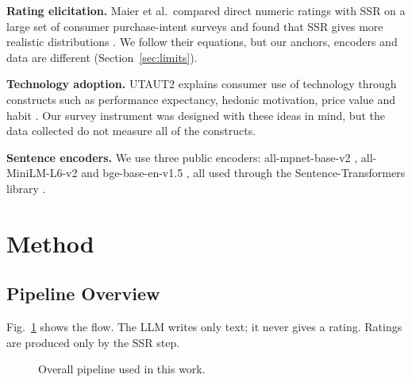 \documentclass[conference]{IEEEtran}
\begin{document}
\textbf{Rating elicitation.} Maier et al.\ compared direct numeric ratings with SSR on a large set of consumer purchase-intent surveys and found that SSR gives more realistic distributions \cite{maier2025}. We follow their equations, but our anchors, encoders and data are different (Section~\ref{sec:limits}).

\textbf{Technology adoption.} UTAUT2 explains consumer use of technology through constructs such as performance expectancy, hedonic motivation, price value and habit \cite{venkatesh2012}. Our survey instrument was designed with these ideas in mind, but the data collected do not measure all of the constructs.

\textbf{Sentence encoders.} We use three public encoders: all-mpnet-base-v2 \cite{song2020}, all-MiniLM-L6-v2 \cite{wang2020} and bge-base-en-v1.5 \cite{xiao2023}, all used through the Sentence-Transformers library \cite{reimers2019}.

\section{Method}
\subsection{Pipeline Overview}
Fig.~\ref{fig:pipe} shows the flow. The LLM writes only text; it never gives a rating. Ratings are produced only by the SSR step.

\begin{figure}[t]
\centering
{}
\caption{Overall pipeline used in this work.}
\label{fig:pipe}
\end{figure}
\end{document}
